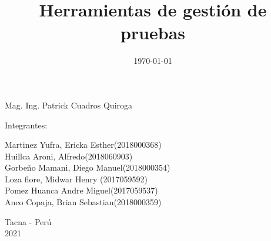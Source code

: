 \documentclass[twoside,twocolumn]{article}
\begin{document}
\begin{titlepage}
\begin{center}
\vspace*{0.1in}
\begin{large}
 Mag. Ing. Patrick Cuadros Quiroga\\
\end{large}

\vspace*{0.2in}
\vspace*{0.1in}
\begin{large}

Integrantes: \\
\begin{flushleft}
Martinez Yufra, Ericka Esther\hfill(2018000368) \\
Huillca Aroni, Alfredo\hfill(2018060903)\\
Gorbeño Mamani, Diego Manuel\hfill(2018000354)\\
Loza flore, Midwar Henry \hfill(2017059592)\\
Pomez Huanca Andre Miguel\hfill(2017059537)\\
Anco Copaja, Brian Sebastian\hfill(2018000359)\\

\end{flushleft}
\end{large}

\vspace*{0.1in}
\begin{large}
Tacna - Perú\\
2021
\end{large}
\end{center}
\end{titlepage}

\setlength{\droptitle}{-4\baselineskip} %

\pretitle{\begin{center}\Huge\bfseries} %
\posttitle{\end{center}} %
\title{Herramientas de gestión de pruebas} %

\date{\today} %
\renewcommand{\maketitlehookd}{%

}




\maketitle
\end{document}
